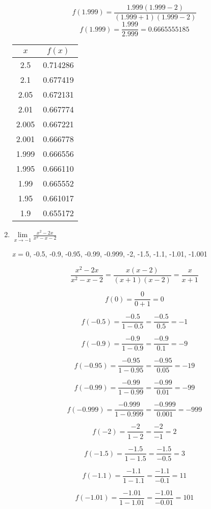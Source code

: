 \documentclass{article}
\begin{document}
\begin{enumerate}
			  $$f(1.999) = \frac{1.999(1.999 - 2)}{(1.999 + 1)(1.999 - 2)}$$
			  $$f(1.999) = \frac{1.999}{2.999} = 0.6665555185$$
\begin{center}
			  \begin{tabular}{|c|c|}
			  	\hline
			  	$x$ & $f(x)$ \\
			  	\hline \hline			  	
			  	2.5 & 0.714286 \\
			  	2.1 &  0.677419 \\
			  	2.05 &  0.672131 \\
			  	2.01 &  0.667774 \\
			  	2.005 &  0.667221 \\
			  	2.001 & 0.666778 \\
			  	1.999 &  0.666556 \\
			  	1.995 & 0.666110 \\
			  	1.99 & 0.665552 \\
			  	1.95 &  0.661017 \\
			  	1.9 &  0.655172 \\
			  	\hline
			  \end{tabular}
\end{center}

			\item $\lim \limits_{x \to -1} \frac{x^2 - 2x}{x^2 - x - 2}$
			
				\emph{x} = 0, -0.5, -0.9, -0.95, -0.99, -0.999, -2, -1.5, -1.1, -1.01, -1.001
				
				$$\frac{x^2 - 2x}{x^2 - x - 2} = \frac{x(x-2)}{(x + 1)(x - 2)} = \frac{x}{x+1}$$
				
				$$f(0) = \frac{0}{0 + 1} = 0$$
				
				$$f(-0.5) = \frac{-0.5}{1 - 0.5} = \frac{-0.5}{0.5} = -1$$
				
				$$f(-0.9) = \frac{-0.9}{1 - 0.9} = \frac{-0.9}{0.1} = -9$$
				
				$$f(-0.95) = \frac{-0.95}{1 - 0.95} = \frac{-0.95}{0.05} = -19$$
				
				$$f(-0.99) = \frac{-0.99}{1- 0.99} = \frac{-0.99}{0.01} = -99$$
				
				$$f(-0.999) = \frac{-0.999}{1 - 0.999} = \frac{-0.999}{0.001} = -999$$
				
				$$f(-2) = \frac{-2}{1-2} = \frac{-2}{-1} = 2$$
				
				$$f(-1.5)  = \frac{-1.5}{1 - 1.5} = \frac{-1.5}{-0.5} = 3$$
				
				$$f(-1.1) = \frac{-1.1}{1 - 1.1} = \frac{-1.1}{-0.1} = 11$$
				
				$$f(-1.01) = \frac{-1.01}{1 - 1.01} = \frac{-1.01}{-0.01} = 101$$
				

\end{enumerate}
\end{document}
